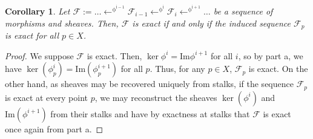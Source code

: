\documentclass[english]{article}
\newcommand{\FF}{\mathscr{F}}
\newcommand{\Fcal}{\mathcal{F}}
\newcommand{\prt}[1]{\setcounter{subsection}{#1-1}\subsection{}}
\newtheorem*{corollary*}{Corollary}
\theoremstyle{remark}
\theoremstyle{definition}
\newcommand{\im}{\mathrm{Im}}
\begin{document}
\prt{3}\begin{corollary*}
	Let $\Fcal:=\hdots\displaystyle{\mathrel{\mathop{\leftarrow}^{\mathrm{\phi^{i-1}}}}}\FF_{i-1}\displaystyle{\mathrel{\mathop{\leftarrow}^{\mathrm{\phi^i}}}}\FF_i\displaystyle{\mathrel{\mathop{\leftarrow}^{\mathrm{\phi^{i+1}}}}}\hdots$ be a sequence of morphisms and sheaves. Then, $\Fcal$ is exact if and only if the induced sequence $\Fcal_p$ is exact for all $p\in X$.
\end{corollary*}
\begin{proof}
	We suppose $\Fcal$ is exact. Then, $\ker\phi^i=\im\phi^{i+1}$ for all $i$, so by part a, we have $\ker(\phi^i_p)=\im(\phi^{i+1}_p)$ for all $p$. Thus, for any $p\in X$, $\Fcal_p$ is exact. On the other hand, as sheaves may be recovered uniquely from stalks, if the sequence $\Fcal_p$ is exact at every point $p$, we may reconstruct the sheaves $\ker(\phi^i)$ and $\im(\phi^{i+1})$ from their stalks and have by exactness at stalks that $\Fcal$ is exact once again from part a.
\end{proof}
\end{document}
